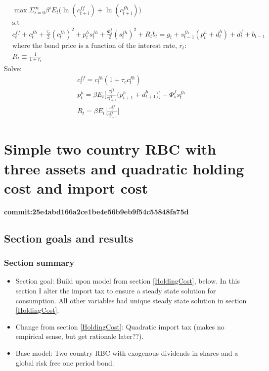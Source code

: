 \documentclass[a4paper]{article}
\begin{document}
\begin{align*}
&\max \Sigma_{i=0}^\infty \beta^i E_t \bigg(\ln(c^{ff}_{t+i})+ \ln(c^{fh}_{t+i}) \bigg)\\ &\text{s.t}\\
&c^{ff}_t+c^{fh}_t+\frac{\tau_c}{2}(c^{fh}_t)^2+ p^{h}_t s^{fh}_t+\frac{\Phi^f_s}{2}(s^{fh}_t)^2 + R_t b_t=g_t+s^{fh}_{t-1}(p^{h}_t+d^{h}_t)+d^{f}_t+b_{t-1}\\
& \text{where the bond price is a function of the interest rate, $r_t$:}\\
&R_t \equiv \frac{1}{1+r_t}
\end{align*}
Solve:
\begin{align*}
&c^{ff}_t=c^{fh}_t(1+\tau_c c^{fh}_t)\\
&p^{h}_t=\beta E_t \bigg[\frac{c^{ff}_t}{c^{ff}_{t+1}} \bigg(  p^{h}_{t+1}+d^{h}_{t+1} \bigg) \bigg] - \Phi^{f}_s s^{fh}_t\\
&R_t=\beta E_t \bigg[\frac{c^{ff}_t}{c^{ff}_{t+1}} \bigg] 
\end{align*}





























\section{Simple two country RBC with three assets and quadratic holding cost and import cost}\label{SquareTax}
\textbf{commit:25e4abd166a2ce1be4e56b9eb9f54c55848fa75d}
\subsection{Section goals and results}
\subsubsection{Section summary}
\begin{itemize}
\item Section goal: Build upon model from section \ref{HoldingCost}, below. In this section I alter the import tax to ensure a steady state solution for consumption. All other variables had unique steady state solution in section \ref{HoldingCost}.
\item Change from section \ref{HoldingCost}: Quadratic import tax (makes no empirical sense, but get rationale later??). 
\item Base model: Two country RBC with exogenous dividends in shares and a global risk free one period bond.
\end{itemize}
\end{document}
